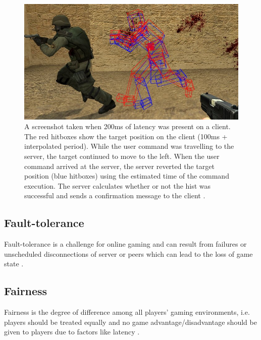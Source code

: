 
\begin{figure}
	\centering
	\includegraphics[width=\textwidth]{Figs/LagCompensation.jpg}
	\caption{ A screenshot taken when 200ms of latency was present on a client. The red hitboxes show the target position on the client (100ms + interpolated period). While the user command was travelling to the server, the target continued to move to the left. When the user command arrived at the server, the server reverted the target position (blue hitboxes) using the estimated time of the command execution. The server calculates whether or not the hist was successful and sends a confirmation message to the client \cite{Source}.}
	\label{fig_LatencyCompensation}
\end{figure}

\subsection{Fault-tolerance}
Fault-tolerance is a challenge for online gaming and can result from failures or unscheduled disconnections of server or peers which can lead to the loss of game state \cite{P2PSurvey}.

\subsection{Fairness}
Fairness is the degree of difference among all players’ gaming environments, i.e. players should be treated equally and no game advantage/disadvantage should be given to players due to factors like latency \cite{P2PSurvey}.

